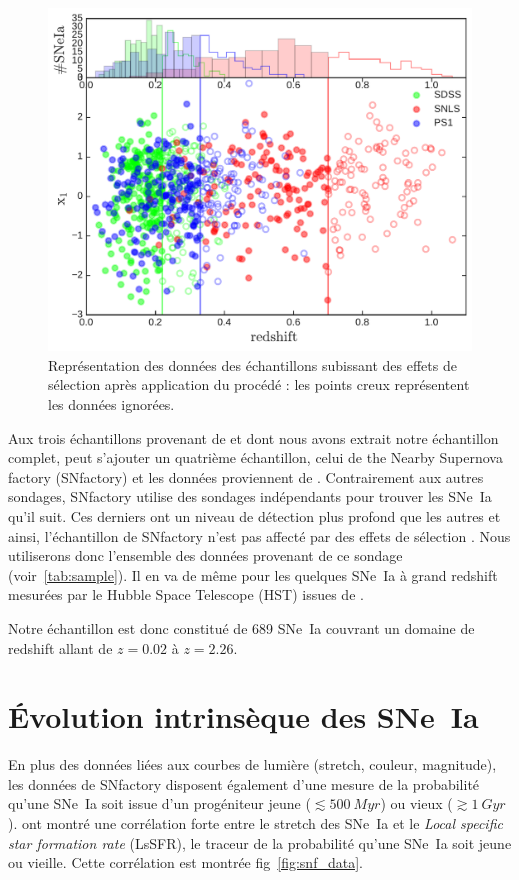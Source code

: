 \documentclass[a4paper, 12pt, svgnames]{article}
\begin{document}
\begin{figure}[htbp!]
    \centering
    \includegraphics[width=.7\linewidth]{Rapport_figures/surveys_cuts.pdf}
    \captionsetup{justification=centering}
    \caption{Représentation des données des échantillons subissant des effets
    de sélection après application du procédé : les points creux représentent
    les données ignorées.}
    \label{fig:surveys_cuts}
\end{figure}

Aux trois échantillons provenant de \cite{scolnic_complete_2018} et dont nous
avons extrait notre échantillon complet, peut s'ajouter un quatrième
échantillon, celui de the Nearby Supernova factory (SNfactory)
\cite{wood-vasey_nearby_2004} et les données proviennent de
\cite{rigault_strong_2018}.  Contrairement aux autres sondages, SNfactory
utilise des sondages indépendants pour trouver les SNe~Ia qu'il suit. Ces
derniers ont un niveau de détection plus profond que les autres et ainsi,
l'échantillon de SNfactory n'est pas affecté par des effets de sélection
\cite{rigault_strong_2018}. Nous utiliserons donc l'ensemble des données
provenant de ce sondage (voir~\ref{tab:sample}). Il en va de même pour les
quelques SNe~Ia à grand redshift mesurées par le Hubble Space Telescope (HST)
issues de \cite{scolnic_complete_2018}. \bigbreak

Notre échantillon est donc constitué de 689 SNe~Ia couvrant un domaine de
redshift allant de $z=0.02$ à $z=2.26$.

\section{Évolution intrinsèque des SNe~Ia}\label{sec:stretchevol}

En plus des données liées aux courbes de lumière (stretch, couleur, magnitude),
les données de SNfactory disposent également d'une mesure de la probabilité
qu'une SNe~Ia soit issue d'un progéniteur jeune ($\lesssim \SI{500}{Myr}$) ou
vieux ($\gtrsim \SI{1}{Gyr}$). \cite{rigault_strong_2018} ont montré une
corrélation forte entre le stretch des SNe~Ia et le \textit{Local specific star
formation rate} (LsSFR), le traceur de la probabilité qu'une SNe~Ia soit jeune
ou vieille. Cette corrélation est montrée fig~\ref{fig:snf_data}.
\end{document}
